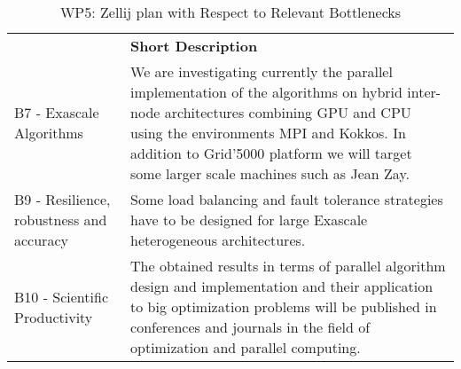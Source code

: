 \begin{table}[h!]
    \centering
    
    \centering
    { 
        \setlength{\parindent}{0pt}
        \def\arraystretch{1.25}
        {
            \fontsize{9}{11}\selectfont
            \begin{tabular}{!{\color{numpexgray}\vrule}p{.25\linewidth}!{\color{numpexgray}\vrule}p{.6885\linewidth}!{\color{numpexgray}\vrule}}
    
     &  {\rule{0pt}{2.5ex}\color{white}\bf Short Description }\\ 
    
    B7 - Exascale Algorithms & We are investigating currently the parallel implementation of the algorithms on hybrid inter-node architectures combining GPU and CPU using the environments MPI and Kokkos. In addition to Grid'5000 platform we will target some larger scale machines such as Jean Zay. \\

    B9 - Resilience, robustness and accuracy & Some load balancing and fault tolerance strategies have to be designed for large Exascale heterogeneous architectures. \\
 
     B10 - Scientific Productivity & The obtained results in terms of parallel algorithm design and implementation and their application to big optimization problems will be published in conferences and journals in the field of optimization and parallel computing. \\
\end{tabular}
        }
    }
    \caption{WP5: Zellij plan with Respect to Relevant Bottlenecks}
    \label{tab:WP5:Zellij:bottlenecks}
\end{table}